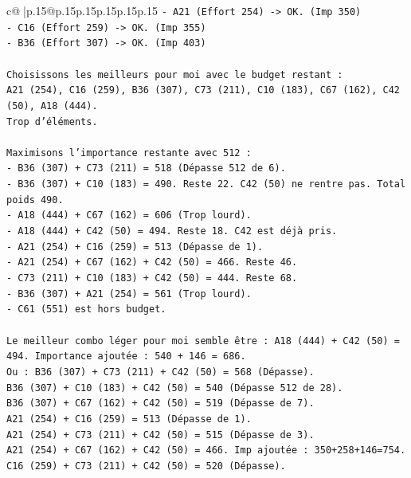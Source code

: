 \documentclass{article}
\begin{document}
{\begin{supertabular}{c@{$\;$}|p{.15\linewidth}@{}p{.15\linewidth}p{.15\linewidth}p{.15\linewidth}p{.15\linewidth}p{.15\linewidth}}
{{{\texttt{{-} A21 (Effort 254) {-}> OK. (Imp 350)} \\
\texttt{{-} C16 (Effort 259) {-}> OK. (Imp 355)} \\
\texttt{{-} B36 (Effort 307) {-}> OK. (Imp 403)} \\
\\ 
\texttt{Choisissons les meilleurs pour moi avec le budget restant :} \\
\texttt{A21 (254), C16 (259), B36 (307), C73 (211), C10 (183), C67 (162), C42 (50), A18 (444).} \\
\texttt{Trop d'éléments.} \\
\\ 
\texttt{Maximisons l'importance restante avec 512 :} \\
\texttt{{-} B36 (307) + C73 (211) = 518 (Dépasse 512 de 6).} \\
\texttt{{-} B36 (307) + C10 (183) = 490. Reste 22. C42 (50) ne rentre pas. Total poids 490.} \\
\texttt{{-} A18 (444) + C67 (162) = 606 (Trop lourd).} \\
\texttt{{-} A18 (444) + C42 (50) = 494. Reste 18. C42 est déjà pris.} \\
\texttt{{-} A21 (254) + C16 (259) = 513 (Dépasse de 1).} \\
\texttt{{-} A21 (254) + C67 (162) + C42 (50) = 466. Reste 46.} \\
\texttt{{-} C73 (211) + C10 (183) + C42 (50) = 444. Reste 68.} \\
\texttt{{-} B36 (307) + A21 (254) = 561 (Trop lourd).} \\
\texttt{{-} C61 (551) est hors budget.} \\
\\ 
\texttt{Le meilleur combo léger pour moi semble être : A18 (444) + C42 (50) = 494. Importance ajoutée : 540 + 146 = 686.} \\
\texttt{Ou : B36 (307) + C73 (211) + C42 (50) = 568 (Dépasse).} \\
\texttt{B36 (307) + C10 (183) + C42 (50) = 540 (Dépasse 512 de 28).} \\
\texttt{B36 (307) + C67 (162) + C42 (50) = 519 (Dépasse de 7).} \\
\texttt{A21 (254) + C16 (259) = 513 (Dépasse de 1).} \\
\texttt{A21 (254) + C73 (211) + C42 (50) = 515 (Dépasse de 3).} \\
\texttt{A21 (254) + C67 (162) + C42 (50) = 466. Imp ajoutée : 350+258+146=754.} \\
\texttt{C16 (259) + C73 (211) + C42 (50) = 520 (Dépasse).} \\
}}}
\end{supertabular}}
\end{document}
